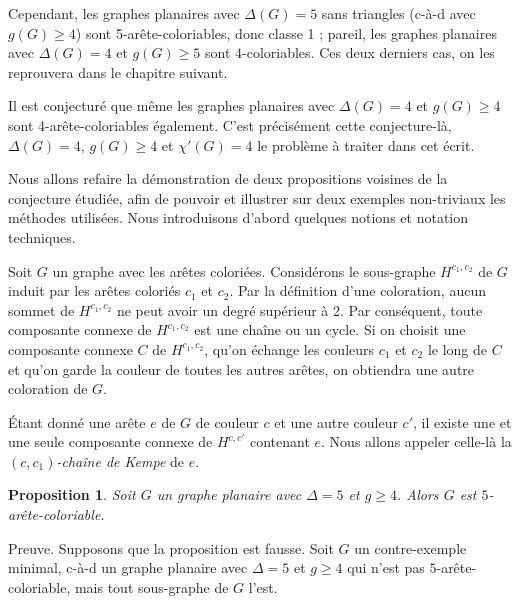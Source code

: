 \documentclass[10pt,a4paper]{article}
\newtheorem{proposition}{Proposition}
\begin{document}
Cependant, les graphes planaires avec $\Delta(G)=5$ sans triangles (c-à-d avec $g(G)\ge 4$) sont 5-arête-coloriables, donc classe 1 ; pareil, les graphes planaires avec $\Delta(G) = 4$ et $g(G)\ge 5$ sont $4$-coloriables. Ces deux derniers cas, on les reprouvera dans le chapitre suivant. 

Il est conjecturé que même les graphes planaires avec $\Delta(G) = 4$ et $g(G) \geq 4$ sont 4-arête-coloriables également. C'est précisément cette conjecture-là, $\Delta(G) = 4$, $g(G) \geq 4$ et $\chi'(G) = 4$ le problème à traiter dans cet écrit. 





Nous allons refaire la démonstration de deux propositions voisines de la conjecture étudiée, afin de pouvoir et illustrer sur deux exemples non-triviaux les méthodes utilisées. Nous introduisons d'abord quelques notions et notation techniques.

Soit $G$ un graphe avec les arêtes coloriées. 
Considérons le sous-graphe $H^{c_1,c_2}$ de $G$ induit par les arêtes coloriés $c_1$ et $c_2$. Par la définition d'une coloration, aucun sommet de $H^{c_1,c_2}$ ne peut avoir un degré supérieur à 2. Par conséquent, toute composante connexe de $H^{c_1,c_2}$ est une chaîne ou un cycle. Si on choisit une composante connexe $C$ de $H^{c_1,c_2}$, qu'on échange les couleurs $c_1$ et $c_2$ le long de $C$ et qu'on garde la couleur de toutes les autres arêtes, on obtiendra une autre coloration de $G$.

Étant donné une arête $e$ de $G$ de couleur $c$ et une autre couleur $c'$, il existe une et une seule composante connexe de $H^{c,c'}$ contenant $e$.
Nous allons appeler celle-là la \emph{$(c,c_1)$-chaîne de Kempe} de $e$. 




\begin{proposition}
Soit $G$ un graphe planaire avec $\Delta = 5$ et $g \geq 4$. Alors $G$ est $5$-arête-coloriable.
\end{proposition}

Preuve. Supposons que la proposition est fausse. Soit $G$ un contre-exemple minimal, c-à-d un graphe planaire avec $\Delta = 5$ et $g \geq 4$ qui n'est pas $5$-arête-coloriable, mais tout sous-graphe de $G$ l'est.
\end{document}

